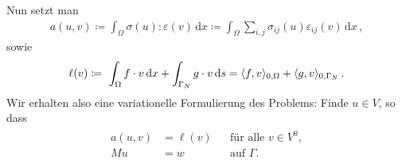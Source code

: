 \documentclass{scrartcl}
\def\e{\varepsilon}
\newcommand{\dif}[1]{\,\mathrm{d} #1}
\DeclarePairedDelimiter{\inner}{\langle}{\rangle}
\begin{document}
Nun setzt man
\begin{align}
	a(u,v)\coloneqq \int_\Omega\sigma(u):\e(v)\dif x\coloneqq\int_\Omega \sum_{i,j}\sigma_{ij}(u)\e_{ij}(v)\dif x\,,
	\label{eq:Definitiona}
\end{align}
sowie
\begin{align}
	\ell(v)\coloneqq\ \int_\Omega f\cdot v\dif x+\int_{\Gamma_N}g\cdot v\dif s = \inner{f,v}_{0,\Omega}+\inner{g,v}_{0,\Gamma_N}\,.
	\label{eq:Definitionell}
\end{align}
Wir erhalten also eine variationelle Formulierung des Problems:
Finde $u\in V$, so dass
\begin{align}
	\begin{aligned}
	a(u,v) &= \ell(v) &&\text{für alle }v\in V^0, \\
	Mu &= w &&\text{auf }\Gamma.
	\end{aligned}
	\label{eq:variationelleFormulierung}
\end{align}
\end{document}
